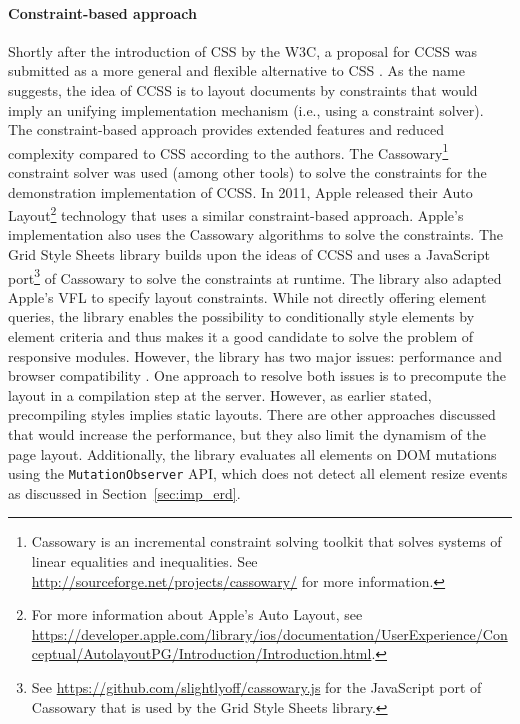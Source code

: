 \documentclass[a4paper,11pt]{kth-mag}
\newcommand{\code}[1]{\texttt{#1}}
\begin{document}
    \paragraph{Constraint-based approach}
    Shortly after the introduction of \gls{CSS} by the \gls{W3C}, a proposal for \gls{CCSS} was submitted as a more general and flexible alternative to \gls{CSS} \cite{badros1999constraint}.
    As the name suggests, the idea of \gls{CCSS} is to layout \glspl{document} by constraints that would imply an unifying implementation mechanism (i.e., using a constraint solver).
    The constraint-based approach provides extended features and reduced complexity compared to \gls{CSS} according to the authors.
    The Cassowary\footnote{Cassowary is an incremental constraint solving toolkit that solves systems of linear equalities and inequalities. See \url{http://sourceforge.net/projects/cassowary/} for more information.} constraint solver was used (among other tools) to solve the constraints for the demonstration implementation of \gls{CCSS}.
    In 2011, Apple released their Auto Layout\footnote{For more information about Apple's Auto Layout, see \url{https://developer.apple.com/library/ios/documentation/UserExperience/Conceptual/AutolayoutPG/Introduction/Introduction.html}.} technology that uses a similar constraint-based approach.
    Apple's implementation also uses the Cassowary algorithms to solve the constraints.
    The Grid Style Sheets library \cite{eq_imp_gss} builds upon the ideas of \gls{CCSS} and uses a \gls{JavaScript} port\footnote{See \url{https://github.com/slightlyoff/cassowary.js} for the \gls{JavaScript} port of Cassowary that is used by the Grid Style Sheets library.} of Cassowary to solve the constraints at runtime.
    The library also adapted Apple's \gls{VFL} to specify layout constraints.
    While not directly offering element queries, the library enables the possibility to conditionally style elements by \gls{element} criteria and thus makes it a good candidate to solve the problem of \gls{responsive} modules.
    However, the library has two major issues: performance and browser compatibility \cite{gss_issue}.
    One approach to resolve both issues is to precompute the layout in a compilation step at the server.
    However, as earlier stated, precompiling styles implies static layouts.
    There are other approaches discussed that would increase the performance, but they also limit the dynamism of the page layout.
    Additionally, the library evaluates all \glspl{element} on \gls{DOM} mutations using the \code{MutationObserver} \gls{API}, which does not detect all element resize events as discussed in Section~\ref{sec:imp_erd}.
\end{document}

